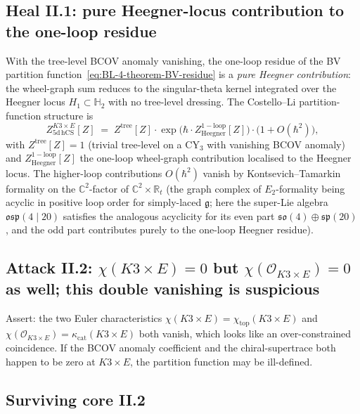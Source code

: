 \subsection*{Heal II.1: pure Heegner-locus contribution to the
one-loop residue}

With the tree-level BCOV anomaly vanishing, the one-loop residue of
the BV partition function~\eqref{eq:BL-4-theorem-BV-residue} is a
\emph{pure Heegner contribution}: the wheel-graph sum reduces to the
singular-theta kernel integrated over the Heegner locus $H_1 \subset
\mathbb{H}_2$ with no tree-level dressing. The Costello--Li
partition-function structure is
\begin{equation}
\label{eq:Z-5d-hcs-factored}
 Z_{5\mathrm{d\,hCS}}^{K3 \times E}[Z]
 \;=\; Z^{\mathrm{tree}}[Z] \cdot \exp\bigl( \hbar \cdot
 Z^{\mathrm{1-loop}}_{\mathrm{Heegner}}[Z] \bigr)
 \cdot \bigl( 1 + O(\hbar^2) \bigr),
\end{equation}
with $Z^{\mathrm{tree}}[Z] = 1$ (trivial tree-level on a CY$_3$ with
vanishing BCOV anomaly) and $Z^{\mathrm{1-loop}}_{\mathrm{Heegner}}[Z]$
the one-loop wheel-graph contribution localised to the Heegner locus.
The higher-loop contributions $O(\hbar^2)$ vanish by
Kontsevich--Tamarkin formality on the $\mathbb{C}^2$-factor of
$\mathbb{C}^2 \times \mathbb{R}_t$ (the graph complex of
$E_2$-formality being acyclic in positive loop order for simply-laced
$\mathfrak{g}$; here the super-Lie algebra $\mathfrak{osp}(4 \mid 20)$
satisfies the analogous acyclicity for its even part
$\mathfrak{so}(4) \oplus \mathfrak{sp}(20)$, and the odd part
contributes purely to the one-loop Heegner residue).

\subsection*{Attack II.2: $\chi(K3 \times E) = 0$ but
$\chi(\mathcal{O}_{K3 \times E}) = 0$ as well; this double vanishing
is suspicious}

Assert: the two Euler characteristics
$\chi(K3 \times E) = \chi_{\mathrm{top}}(K3 \times E)$ and
$\chi(\mathcal{O}_{K3 \times E}) = \kappa_{\mathrm{cat}}(K3 \times E)$
both vanish, which looks like an over-constrained coincidence. If the
BCOV anomaly coefficient and the chiral-supertrace both happen to be
zero at $K3 \times E$, the partition function may be ill-defined.

\subsection*{Surviving core II.2}

